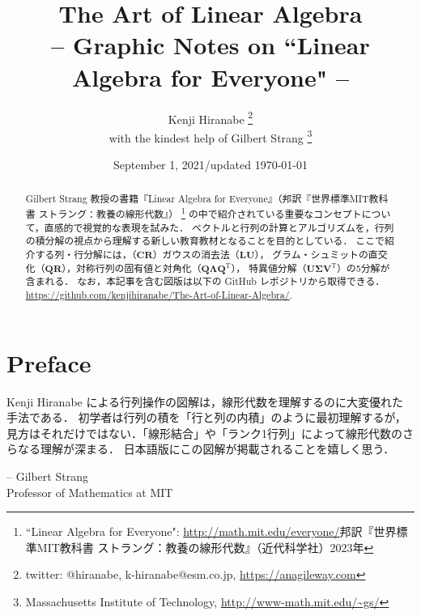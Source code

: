 \documentclass[letterpaper]{article}
\DeclareRobustCommand\transp{^{\mathrm{T}}}
\begin{document}
\title{The Art of Linear Algebra\\
\vspace{5pt}
\large{
-- Graphic Notes on ``Linear Algebra for Everyone" --
}
}

\author{Kenji Hiranabe
\thanks{twitter: @hiranabe, k-hiranabe@esm.co.jp, \url{https://anagileway.com}} \\
with the kindest help of Gilbert Strang
\thanks{Massachusetts Institute of Technology, \url{http://www-math.mit.edu/\~gs/}}
}

\date{September 1, 2021/updated \today}

\maketitle

\vspace{-5pt}
 
\begin{abstract}
Gilbert Strang 教授の書籍『Linear Algebra for Everyone』（邦訳『世界標準MIT教科書 ストラング：教養の線形代数』）
\footnote{``Linear Algebra for Everyone":
\url{http://math.mit.edu/everyone/}邦訳『世界標準MIT教科書 ストラング：教養の線形代数』（近代科学社）2023年}
の中で紹介されている重要なコンセプトについて，直感的で視覚的な表現を試みた．
ベクトルと行列の計算とアルゴリズムを，行列の積分解の視点から理解する新しい教育教材となることを目的としている．
ここで紹介する列・行分解には，（$\bm{CR}$）ガウスの消去法（$\bm{LU}$），
グラム・シュミットの直交化（$\bm{QR}$），対称行列の固有値と対角化（$\bm{Q \Lambda Q\transp}$），
特異値分解（$\bm{U \Sigma V\transp}$）の5分解が含まれる．
なお，本記事を含む図版は以下の GitHub レポジトリから取得できる．\url{https://github.com/kenjihiranabe/The-Art-of-Linear-Algebra/}.
\end{abstract}

\section*{Preface}
Kenji Hiranabe による行列操作の図解は，線形代数を理解するのに大変優れた手法である．
初学者は行列の積を「行と列の内積」のように最初理解するが，
見方はそれだけではない．「線形結合」や「ランク1行列」によって線形代数のさらなる理解が深まる．
日本語版にこの図解が掲載されることを嬉しく思う．
\begin{flushright}
-- Gilbert Strang \\ Professor of Mathematics at MIT
\end{flushright}
\end{document}
